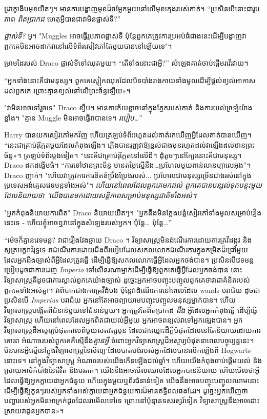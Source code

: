 ដ្រាកូ​ងើប​មុខ​យឺតៗ។ មាន​ការ​បង្ហាញ​មុខ​ដ៏​ចម្លែក​មួយ​នៅ​លើ​មុខ​ក្មេង​របស់​គាត់។ “ប្រសិនបើនោះជារូបភាព \emph{ពិតប្រាកដ} ហេតុអ្វីបានជាវាមិនផ្លាស់ទី?”

\emph{ផ្លាស់ទី?} អូ។ "Muggles អាច​ធ្វើ​រូបភាព​ផ្លាស់ទី ប៉ុន្តែ​ពួកគេ​ត្រូវ​ការ​ប្រអប់​ធំ​ជាង​នេះ​ដើម្បី​បង្ហាញ​វា ពួកគេ​មិន​អាច​ដាក់​វា​នៅលើ​ទំព័រ​សៀវភៅ​តែមួយ​បាន​នៅឡើយ​ទេ"។

ម្រាមដៃរបស់ Draco ផ្លាស់ទីទៅឈុតមួយ។ “តើទាំងនោះជាអ្វី?” សំឡេង​គាត់​ចាប់​ផ្ដើម​រវើរវាយ។

“អ្នក​ទាំង​នោះ​គឺ​ជា​មនុស្ស។ ពួកគេ​ស្លៀក​ឈុត​ដែល​បិទបាំង​រាងកាយ​ទាំងមូល​ដើម្បី​ផ្តល់​ខ្យល់អាកាស​ដល់​ពួកគេ ព្រោះ​គ្មាន​ខ្យល់​នៅលើ​ព្រះច័ន្ទ​ឡើយ​»​។

"វាមិនអាចទៅរួចទេ" Draco ខ្សឹប។ មាន​ការ​ភ័យ​ខ្លាច​នៅ​ក្នុង​ភ្នែក​របស់​គាត់ និង​ការ​យល់​ច្រឡំ​យ៉ាង​ខ្លាំង។ "គ្មាន Muggle មិនអាចធ្វើវាបានទេ។ \emph{របៀប…}”

Harry បានយកសៀវភៅមកវិញ ហើយត្រឡប់ទំព័ររហូតដល់គាត់រកឃើញអ្វីដែលគាត់បានឃើញ។ “នេះ​ជា​គ្រាប់​រ៉ុក្កែត​មួយ​ដែល​កំពុង​ឡើង​។ ភ្លើង​បាន​រុញ​វា​ឱ្យ​ខ្ពស់​ជាង​មុន​រហូត​ដល់​វា​ឡើង​ដល់​ឋាន​ព្រះ​ច័ន្ទ»។ ត្រឡប់ទំព័រម្តងទៀត។ “នេះគឺជាគ្រាប់រ៉ុក្កែតនៅលើដី។ ដុំតូចៗនៅក្បែរនោះគឺជាមនុស្ស។ Draco ដកដង្ហើមធំ។ “ការទៅឋានព្រះច័ន្ទ មានតម្លៃស្មើនឹង…ប្រហែលមួយពាន់លានហ្គាលេអុង”។ Draco ញាក់។ "ហើយវាត្រូវការការខិតខំប្រឹងប្រែងរបស់... ប្រហែលជាមនុស្សច្រើនជាងរស់នៅក្នុងប្រទេសអង់គ្លេសវេទមន្តទាំងអស់"។ \emph{ ហើយនៅពេលដែលពួកគេមកដល់ ពួកគេបានបន្សល់ទុកបន្ទះមួយដែលនិយាយថា 'យើងបានមកដោយសន្តិភាពសម្រាប់មនុស្សជាតិទាំងអស់។}

"អ្នកកំពុងនិយាយការពិត" Draco និយាយយឺតៗ។ "អ្នកនឹងមិនក្លែងបន្លំសៀវភៅទាំងមូលសម្រាប់រឿងនេះទេ - ហើយខ្ញុំអាចឮវានៅក្នុងសំឡេងរបស់អ្នក។ ប៉ុន្តែ… ប៉ុន្តែ…”

“ម៉េច​ក៏​គ្មាន​វេទមន្ត? វាជារឿងវែងឆ្ងាយ Draco ។ វិទ្យាសាស្រ្តមិនដំណើរការដោយការគ្រវីដង្កូវ និងសូត្រអក្ខរាវិរុទ្ធទេ វាដំណើរការដោយដឹងពីរបៀបដែលសកលលោកដំណើរការក្នុងកម្រិតដ៏ជ្រៅមួយ ដែលអ្នកដឹងច្បាស់ពីអ្វីដែលត្រូវធ្វើ ដើម្បីធ្វើឱ្យសកលលោកធ្វើអ្វីដែលអ្នកចង់បាន។ ប្រសិនបើវេទមន្តប្រៀបដូចជាការដេញ \emph{Imperio} ទៅលើនរណាម្នាក់ដើម្បីធ្វើឱ្យពួកគេធ្វើអ្វីដែលអ្នកចង់បាន នោះវិទ្យាសាស្ត្រគឺដូចជាការស្គាល់ពួកគេយ៉ាងច្បាស់ ដូច្នេះអ្នកអាចបញ្ចុះបញ្ចូលពួកគេថាវាជាគំនិតរបស់ពួកគេទាំងអស់គ្នា។ វាពិបាកជាងការគ្រវីដំបង ប៉ុន្តែវាដំណើរការនៅពេលដែល wands បរាជ័យ ដូចជាប្រសិនបើ \emph{Imperius} បរាជ័យ អ្នកនៅតែអាចព្យាយាមបញ្ចុះបញ្ចូលមនុស្សម្នាក់បាន។ ហើយវិទ្យាសាស្ត្របង្កើតពីជំនាន់មួយទៅជំនាន់មួយ។ អ្នកត្រូវតែពិតប្រាកដ \emph{ដឹង} អ្វីដែលអ្នកកំពុងធ្វើ ដើម្បីធ្វើវិទ្យាសាស្ត្រ ហើយនៅពេលដែលអ្នកពិតជាយល់អ្វីមួយ អ្នកអាចពន្យល់វាទៅអ្នកផ្សេងបាន។ អ្នកវិទ្យាសាស្ត្រដ៏អស្ចារ្យបំផុតកាលពីមួយសតវត្សមុន ដែលជាឈ្មោះដ៏ភ្លឺបំផុតដែលនៅតែនិយាយដោយការគោរព អំណាចរបស់ពួកគេគឺស្មើនឹង\emph{គ្មានអ្វី} ចំពោះអ្នកវិទ្យាសាស្ត្រដ៏អស្ចារ្យបំផុតនាពេលបច្ចុប្បន្ននេះ។ មិនមានអ្វីស្មើនៅក្នុងវិទ្យាសាស្ត្រនៃសិល្បៈដែលបាត់បង់របស់អ្នកដែលបានលើកឡើងពី Hogwarts នោះទេ។ នៅក្នុងវិទ្យាសាស្ត្រ អំណាចរបស់យើងកើនឡើងដល់ឆ្នាំ។ ហើយយើងកំពុងចាប់ផ្តើមយល់ និងស្រាយអាថ៌កំបាំងនៃជីវិត និងមរតក។ យើង​នឹង​អាច​មើល​ឈាម​ដែល​អ្នក​បាន​និយាយ ហើយ​មើល​ថា​អ្វី​ដែល​ធ្វើ​ឱ្យ​អ្នក​ក្លាយ​ជា​អ្នក​ជំនួយ ហើយ​ក្នុង​មួយ​ឬ​ពីរ​ជំនាន់​ទៀត យើង​នឹង​អាច​បញ្ចុះបញ្ចូល​ឈាម​នោះ​ដើម្បី​ធ្វើ​ឱ្យ​កូនៗ​របស់​អ្នក​ទាំងអស់​ក្លាយជា​អ្នក​ជំនួយការ​ដ៏​មាន​ឥទ្ធិពល​ផងដែរ។ ដូច្នេះ​អ្នក​ឃើញ​ថា បញ្ហា​របស់​អ្នក​មិន​អាក្រក់​ដូច​ដែល​វា​មើល​ទៅ​ទេ ព្រោះ​នៅ​ប៉ុន្មាន​ទសវត្សរ៍​ទៀត វិទ្យាសាស្ត្រ​នឹង​អាច​ដោះស្រាយ​វា​ជូន​អ្នក​បាន»។

